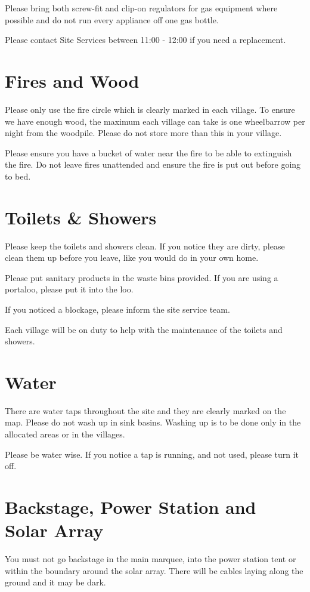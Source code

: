 \documentclass[a4paper, 11pt]{report}
\begin{document}
Please bring both screw-fit and clip-on regulators for gas equipment where possible and do not run every appliance off one gas bottle.\nl

Please contact Site Services between 11:00 - 12:00 if you need a replacement.

\section{Fires and Wood}
Please only use the fire circle which is clearly marked in each village. To ensure we have enough wood, the maximum each village can take is one wheelbarrow per night from the woodpile. Please do not store more than this in your village. \nl

Please ensure you have a bucket of water near the fire to be able to extinguish the fire. Do not leave fires unattended and ensure the fire is put out before going to bed.

\section{Toilets \& Showers}
Please keep the toilets and showers clean. If you notice they are dirty, please clean them up before you leave, like you would do in your own home.\nl

Please put sanitary products in the waste bins provided. If you are using a portaloo, please put it into the loo.\nl

If you noticed a blockage, please inform the site service team.\nl

Each village will be on duty to help with the maintenance of the toilets and showers. \nl

\section{Water}
There are water taps throughout the site and they are clearly marked on the map. Please do not wash up in sink basins. Washing up is to be done only in the allocated areas or in the villages.\nl

Please be water wise. If you notice a tap is running, and not used, please turn it off.

\section{Backstage, Power Station and Solar Array}
You must not go backstage in the main marquee, into the power station tent or within the boundary around the solar array. There will be cables laying along the ground and it may be dark.\nl
\end{document}
